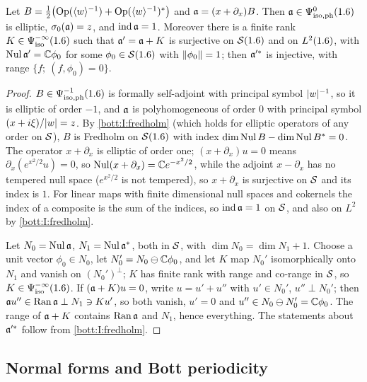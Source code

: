 \begin{lemma}\label{bott:lem:annihilation}
  Let $B=\frac12\bigl(\operatorname{Op}(\langle w\rangle^{-1})+\operatorname{Op}(\langle w\rangle^{-1})^*\bigr)$ and
  $\mathfrak{a}=(x+\partial_x)B$. Then $\mathfrak{a}\in\Psi^{0}_{\mathrm{iso,ph}}(1.6)$ is elliptic, $\sigma_0(\mathfrak{a})=z$,
  and $\operatorname{ind}\mathfrak{a}=1$. Moreover there is a finite rank $K\in\Psi^{-\infty}_{\mathrm{iso}}(1.6)$ such that
  $\mathfrak{a}'=\mathfrak{a}+K$ is surjective on $\mathcal{S}(1.6)$ and on $L^2(1.6)$, with
  $\operatorname{Nul}\mathfrak{a}'=\mathbb{C}\phi_0$ for some $\phi_0\in\mathcal{S}(1.6)$ with $\lVert \phi_0\rVert=1$; then
  $\mathfrak{a}'^*$ is injective, with range $\{f;\ (f,\phi_0)=0\}$.
\end{lemma}
\begin{proof}
  $B\in\Psi^{-1}_{\mathrm{iso,ph}}(1.6)$ is formally self-adjoint with principal symbol $\lvert w\rvert^{-1}$, so it is
  elliptic of order $-1$, and $\mathfrak{a}$ is polyhomogeneous of order $0$ with principal symbol
  $(x+i\xi)/\lvert w\rvert=z$. By \ref{bott:I:fredholm} (which holds for elliptic operators of any
  order on $\mathcal{S}$), $B$ is Fredholm on $\mathcal{S}(1.6)$ with index $\dim\operatorname{Nul} B-\dim\operatorname{Nul} B^*=0$.
  The operator $x+\partial_x$ is elliptic of order one; $(x+\partial_x)u=0$ means
  $\partial_x(e^{x^2/2}u)=0$, so $\operatorname{Nul}(x+\partial_x)=\mathbb{C} e^{-x^2/2}$, while the adjoint
  $x-\partial_x$ has no tempered null space ($e^{x^2/2}$ is not tempered), so
  $x+\partial_x$ is surjective on $\mathcal{S}$ and its index is $1$. For linear maps with finite
  dimensional null spaces and cokernels the index of a composite is the sum of the
  indices, so $\operatorname{ind}\mathfrak{a}=1$ on $\mathcal{S}$, and also on $L^2$ by \ref{bott:I:fredholm}.

  Let $N_0=\operatorname{Nul}\mathfrak{a}$, $N_1=\operatorname{Nul}\mathfrak{a}^*$, both in $\mathcal{S}$, with $\dim N_0=\dim N_1+1$. Choose
  a unit vector $\phi_0\in N_0$, let $N_0'=N_0\ominus\mathbb{C}\phi_0$, and let $K$ map $N_0'$
  isomorphically onto $N_1$ and vanish on $(N_0')^\perp$; $K$ has finite rank with range
  and co-range in $\mathcal{S}$, so $K\in\Psi^{-\infty}_{\mathrm{iso}}(1.6)$. If $(\mathfrak{a}+K)u=0$, write $u=u'+u''$
  with $u'\in N_0'$, $u''\perp N_0'$; then $\mathfrak{a} u''\in\operatorname{Ran}\mathfrak{a}\perp N_1\ni Ku'$, so both
  vanish, $u'=0$ and $u''\in N_0\ominus N_0'=\mathbb{C}\phi_0$. The range of $\mathfrak{a}+K$ contains
  $\operatorname{Ran}\mathfrak{a}$ and $N_1$, hence everything. The statements about $\mathfrak{a}'^*$ follow from
  \ref{bott:I:fredholm}.
\end{proof}

\subsection{Normal forms and Bott periodicity}

